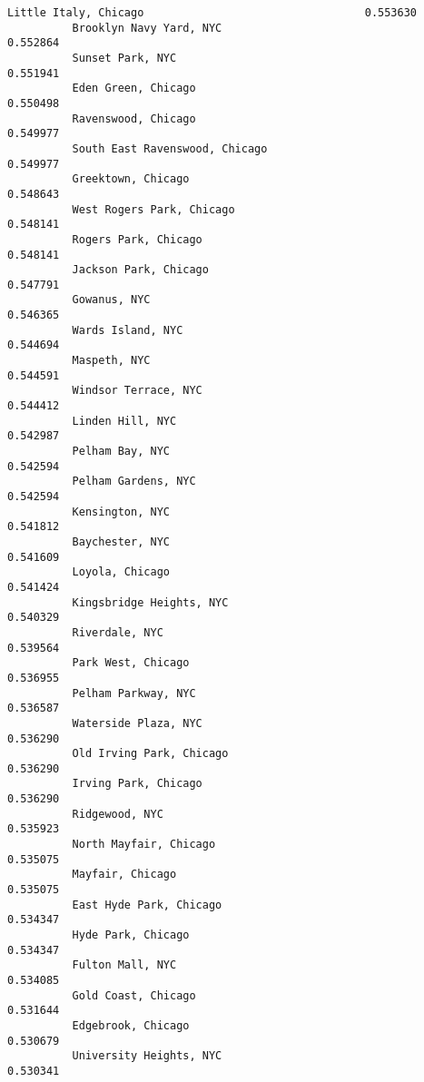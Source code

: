 \documentclass[11pt]{article}
\begin{document}
\begin{Verbatim}[commandchars=\\\{\}]
          Little Italy, Chicago                                  0.553630
          Brooklyn Navy Yard, NYC                                0.552864
          Sunset Park, NYC                                       0.551941
          Eden Green, Chicago                                    0.550498
          Ravenswood, Chicago                                    0.549977
          South East Ravenswood, Chicago                         0.549977
          Greektown, Chicago                                     0.548643
          West Rogers Park, Chicago                              0.548141
          Rogers Park, Chicago                                   0.548141
          Jackson Park, Chicago                                  0.547791
          Gowanus, NYC                                           0.546365
          Wards Island, NYC                                      0.544694
          Maspeth, NYC                                           0.544591
          Windsor Terrace, NYC                                   0.544412
          Linden Hill, NYC                                       0.542987
          Pelham Bay, NYC                                        0.542594
          Pelham Gardens, NYC                                    0.542594
          Kensington, NYC                                        0.541812
          Baychester, NYC                                        0.541609
          Loyola, Chicago                                        0.541424
          Kingsbridge Heights, NYC                               0.540329
          Riverdale, NYC                                         0.539564
          Park West, Chicago                                     0.536955
          Pelham Parkway, NYC                                    0.536587
          Waterside Plaza, NYC                                   0.536290
          Old Irving Park, Chicago                               0.536290
          Irving Park, Chicago                                   0.536290
          Ridgewood, NYC                                         0.535923
          North Mayfair, Chicago                                 0.535075
          Mayfair, Chicago                                       0.535075
          East Hyde Park, Chicago                                0.534347
          Hyde Park, Chicago                                     0.534347
          Fulton Mall, NYC                                       0.534085
          Gold Coast, Chicago                                    0.531644
          Edgebrook, Chicago                                     0.530679
          University Heights, NYC                                0.530341

\end{Verbatim}
\end{document}

